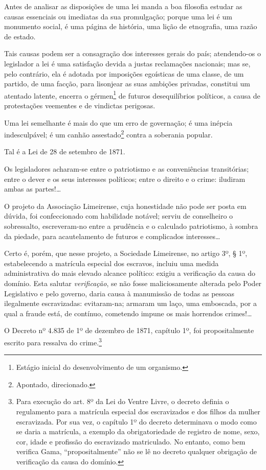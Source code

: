 Antes de analisar as disposições de uma lei manda a boa filosofia
estudar as causas essenciais ou imediatas da sua promulgação; porque uma
lei é um monumento social, é uma página de história, uma lição de
etnografia, uma razão de estado.

Tais causas podem ser a consagração dos interesses gerais do país;
atendendo-os o legislador a lei é uma satisfação devida a justas
reclamações nacionais; mas se, pelo contrário, ela é adotada por
imposições egoísticas de uma classe, de um partido, de uma facção, para
lisonjear as suas ambições privadas, constitui um atentado latente,
encerra o gérmen\footnote{Estágio inicial do desenvolvimento de um
  organismo.} de futuros desequilíbrios políticos, a causa de
protestações veementes e de vindictas perigosas.

Uma lei semelhante é mais do que um erro de governação; é uma inépcia
indesculpável; é um canhão assestado\footnote{Apontado, direcionado.}
contra a soberania popular.

Tal é a Lei de 28 de setembro de 1871.

Os legisladores acharam-se entre o patriotismo e as conveniências
transitórias; entre o dever e os seus interesses políticos; entre o
direito e o crime: iludiram ambas as partes!\ldots{}

O projeto da Associação Limeirense, cuja honestidade não pode ser posta
em dúvida, foi confeccionado com habilidade notável; serviu de
conselheiro o sobressalto, escreveram-no entre a prudência e o calculado
patriotismo, à sombra da piedade, para acautelamento de futuros e
complicados interesses\ldots{}

Certo é, porém, que nesse projeto, a Sociedade Limeirense, no artigo 3º,
§ 1º, estabelecendo a matrícula especial dos escravos, incluiu uma
medida administrativa do mais elevado alcance político: exigiu a
verificação da causa do domínio. Esta salutar \emph{verificação}, se não
fosse maliciosamente alterada pelo Poder Legislativo e pelo governo,
daria causa à manumissão de todas as pessoas ilegalmente escravizadas:
evitaram-na; armaram um laço, uma emboscada, por a qual a fraude está,
de contínuo, cometendo impune os mais horrendos crimes!\ldots{}

O Decreto nº 4.835 de 1º de dezembro de 1871, capítulo 1º, foi
propositalmente escrito para ressalva do crime.\footnote{Para execução
  do art. 8º da Lei do Ventre Livre, o decreto definia o regulamento
  para a matrícula especial dos escravizados e dos filhos da mulher
  escravizada. Por sua vez, o capítulo 1º do decreto determinava o modo
  como se daria a matrícula, a exemplo da obrigatoriedade de registro de
  nome, sexo, cor, idade e profissão do escravizado matriculado. No
  entanto, como bem verifica Gama, ``propositalmente'' não se lê no
  decreto qualquer obrigação de verificação da causa do domínio.}

